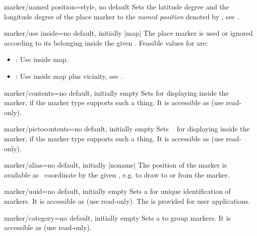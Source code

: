\begin{docMrcKey}{marker/named position}{=}{style, no default}
  Sets the latitude degree and the longitude degree of the place marker
  to the \emph{named position} denoted by , see .
\end{docMrcKey}

\begin{docMrcKey}{marker/use inside}{=}{no default, initially |map|}
  The place marker is used or ignored according to its belonging inside the
  given . Feasible values for  are:
  \begin{itemize}
  \item{}: Use inside map.
  \item{}: Use inside map plus vicinity, see .
  \end{itemize}
\end{docMrcKey}


\begin{docMrcKey}{marker/contents}{=}{no default, initially empty}
  Sets  for displaying inside the marker, if
  the marker type supports such a thing.
  It is accessible as  (use read-only).
\end{docMrcKey}

\begin{docMrcKey}{marker/pictocontents}{=}{no default, initially empty}
  Sets \tikzname\  for displaying inside the marker, if
  the marker type supports such a thing.
  It is accessible as  (use read-only).
\end{docMrcKey}

\begin{docMrcKey}{marker/alias}{=}{no default, initially |noname|}
  The position of the marker is available as \tikzname\ coordinate by
  the given , e.g. to draw to or from the marker.
\end{docMrcKey}

\begin{docMrcKey}{marker/uuid}{=}{no default, initially empty}
  Sets a  for unique identification of markers.
  It is accessible as  (use read-only).
  The  is provided for user applications.
\end{docMrcKey}


\begin{docMrcKey}{marker/category}{=}{no default, initially empty}
  Sets a  to group markers.
  It is accessible as  (use read-only).
\end{docMrcKey}

